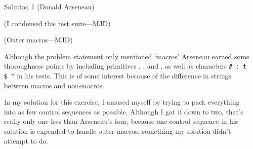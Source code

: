 \begin{solution}{Solution 1 (Donald Arseneau)}
\begin{lcode}
\show\test \show\Test
\end{lcode}

(I condensed this test suite---MJD)

(Outer macros---MJD)
\begin{lcode}

\bye  %
\end{lcode}
\end{solution}

Although the problem statement only mentioned `macros' Arseneau
earned some thoroughness points by including primitives \cmd{\halign},
\cmd{\relax}, and \cmd{\csname}, as well as characters \verb?# : t $ ^? 
in his tests.
This is of some interest because of the difference in \cmd{\meaning}
strings between macros and non-macros.

In my solution for this exercise, I amused myself by trying to pack
everything into as few control sequences as possible. Although I got
it down to two, that's really only one less than Arseneau's four,
because one control sequence in his solution is expended to
handle outer macros, something my solution didn't attempt to do.

